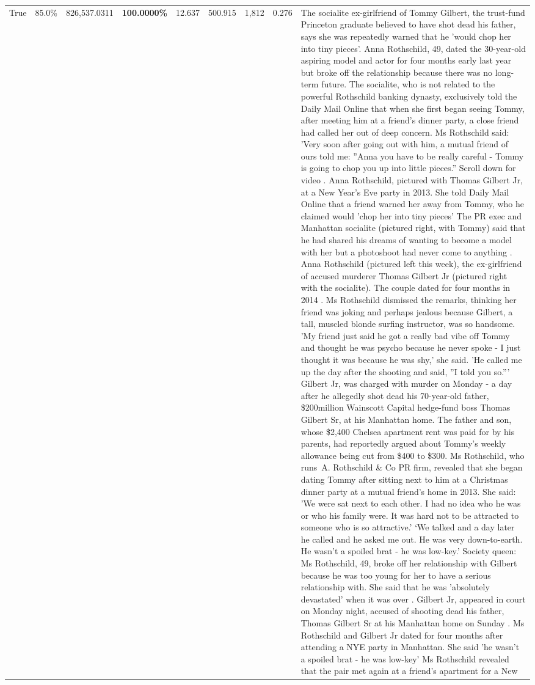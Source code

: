 \begin{table}[H]
\begin{tabular}{lllrlllll}
True & 85.0\% & 826,537.0311 & \bfseries \color{red} 100.0000\% & 12.637 & 500.915 & 1,812 & 0.276 & The socialite ex-girlfriend of Tommy Gilbert, the trust-fund Princeton graduate believed to have shot dead his father, says she was repeatedly warned that he 'would chop her into tiny pieces'. Anna Rothschild, 49, dated the 30-year-old aspiring model and actor for four months early last year but broke off the relationship because there was no long-term future. The socialite, who is not related to the powerful Rothschild banking dynasty, exclusively told the Daily Mail Online that when she first began seeing Tommy, after meeting him at a friend's dinner party, a close friend had called her out of deep concern. Ms Rothschild said: 'Very soon after going out with him, a mutual friend of ours told me: ''Anna you have to be really careful - Tommy is going to chop you up into little pieces.'' Scroll down for video . Anna Rothschild, pictured with Thomas Gilbert Jr, at a New Year's Eve party in 2013. She told Daily Mail Online that a friend warned her away from Tommy, who he claimed would 'chop her into tiny pieces' The PR exec and Manhattan socialite (pictured right, with Tommy) said that he had shared his dreams of wanting to become a model with her but a photoshoot had never come to anything . Anna Rothschild (pictured left this week), the ex-girlfriend of accused murderer Thomas Gilbert Jr (pictured right with the socialite). The couple dated for four months in 2014 . Ms Rothschild dismissed the remarks, thinking her friend was joking and perhaps jealous because Gilbert, a tall, muscled blonde surfing instructor, was so handsome. 'My friend just said he got a really bad vibe off Tommy and thought he was psycho because he never spoke - I just thought it was because he was shy,' she said. 'He called me up the day after the shooting and said, ''I told you so.''' Gilbert Jr, was charged with murder on Monday - a day after he allegedly shot dead his 70-year-old father, \$200million Wainscott Capital hedge-fund boss Thomas Gilbert Sr, at his Manhattan home. The father and son, whose \$2,400 Chelsea apartment rent was paid for by his parents, had reportedly argued about Tommy's weekly allowance being cut from \$400 to \$300. Ms Rothschild, who runs A. Rothschild \& Co PR firm, revealed that she began dating Tommy after sitting next to him at a Christmas dinner party at a mutual friend's home in 2013. She said: 'We were sat next to each other. I had no idea who he was or who his family were. It was hard not to be attracted to someone who is so attractive.' ‘We talked and a day later he called and he asked me out. He was very down-to-earth. He wasn’t a spoiled brat - he was low-key.’ Society queen: Ms Rothschild, 49, broke off her relationship with Gilbert because he was too young for her to have a serious relationship with. She said that he was 'absolutely devastated' when it was over . Gilbert Jr, appeared in court on Monday night, accused of shooting dead his father, Thomas Gilbert Sr at his Manhattan home on Sunday . Ms Rothschild and Gilbert Jr dated for four months after attending a NYE party in Manhattan. She said 'he wasn't a spoiled brat - he was low-key' Ms Rothschild revealed that the pair met again at a friend’s apartment for a New 
\end{tabular}
\end{table}
